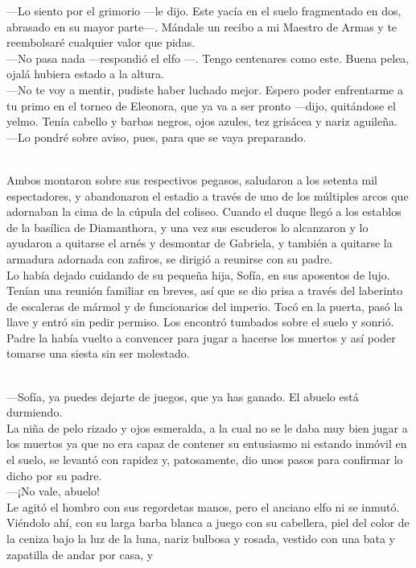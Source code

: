 \documentclass[
  letterpaper,
]{book}
\begin{document}
---Lo siento por el grimorio ---le dijo. Este yacía en el suelo
fragmentado en dos, abrasado en su mayor parte---. Mándale un recibo a
mi Maestro de Armas y te reembolsaré cualquier valor que pidas.\\
---No pasa nada ---respondió el elfo ---. Tengo centenares como este.
Buena pelea, ojalá hubiera estado a la altura.\\
---No te voy a mentir, pudiste haber luchado mejor. Espero poder
enfrentarme a tu primo en el torneo de Eleonora, que ya va a ser pronto
---dijo, quitándose el yelmo. Tenía cabello y barbas negros, ojos
azules, tez grisácea y nariz aguileña.\\
---Lo pondré sobre aviso, pues, para que se vaya preparando.\\
\strut \\
Ambos montaron sobre sus respectivos pegasos, saludaron a los setenta
mil espectadores, y abandonaron el estadio a través de uno de los
múltiples arcos que adornaban la cima de la cúpula del coliseo. Cuando
el duque llegó a los establos de la basílica de Diamanthora, y una vez
sus escuderos lo alcanzaron y lo ayudaron a quitarse el arnés y
desmontar de Gabriela, y también a quitarse la armadura adornada con
zafiros, se dirigió a reunirse con su padre.\\
Lo había dejado cuidando de su pequeña hija, Sofía, en sus aposentos de
lujo. Tenían una reunión familiar en breves, así que se dio prisa a
través del laberinto de escaleras de mármol y de funcionarios del
imperio. Tocó en la puerta, pasó la llave y entró sin pedir permiso. Los
encontró tumbados sobre el suelo y sonrió. Padre la había vuelto a
convencer para jugar a hacerse los muertos y así poder tomarse una
siesta sin ser molestado.\\
\strut \\
---Sofía, ya puedes dejarte de juegos, que ya has ganado. El abuelo está
durmiendo.\\
La niña de pelo rizado y ojos esmeralda, a la cual no se le daba muy
bien jugar a los muertos ya que no era capaz de contener su entusiasmo
ni estando inmóvil en el suelo, se levantó con rapidez y, patosamente,
dio unos pasos para confirmar lo dicho por su padre.\\
---¡No vale, abuelo!\\
Le agitó el hombro con sus regordetas manos, pero el anciano elfo ni se
inmutó. Viéndolo ahí, con su larga barba blanca a juego con su
cabellera, piel del color de la ceniza bajo la luz de la luna, nariz
bulbosa y rosada, vestido con una bata y zapatilla de andar por casa, y
\end{document}
